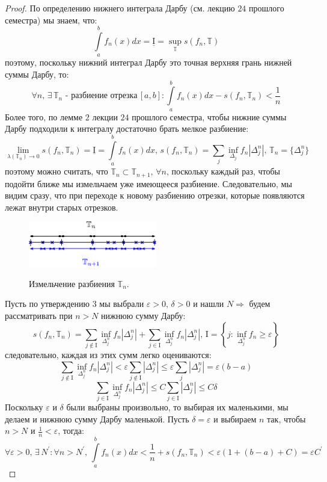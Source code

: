 \documentclass[12pt]{article}
\newcommand{\MTB}{\mathbb{T}}
\newcommand{\MI}{\mathrm{I}}
\newcommand{\VE}{\varepsilon}
\theoremstyle{definition}
\newcommand{\ddint}[2]{\displaystyle\int\limits_{#1}^{#2}}
\begin{document}
\begin{proof}
	По определению нижнего интеграла Дарбу (см. лекцию $24$ прошлого семестра) мы знаем, что: 
	$$
		\ddint{a}{b}f_n(x)dx = \underline{\MI} = \sup\limits_{\MTB}s(f_n,\MTB)
	$$
	поэтому, поскольку нижний интеграл Дарбу это точная верхняя грань нижней суммы Дарбу, то:
	$$
		\forall n, \, \exists \, \MTB_n \text{ - разбиение отрезка} \, [a,b] \colon \ddint{a}{b} f_n(x)dx - s(f_n, \MTB_n) < \dfrac{1}{n}
	$$
	Более того, по лемме $2$ лекции $24$ прошлого семестра, чтобы нижние суммы Дарбу подходили к интегралу достаточно брать мелкое разбиение:
	$$
		\lim\limits_{\lambda(\MTB_n) \to 0} s(f_n,\MTB_n)  = \underline{\MI} = \ddint{a}{b}f_n(x)dx, \, s(f_n, \MTB_n) = \sum\limits_{j}\inf\limits_{\Delta_j}f_n |\Delta_j^n|, \, \MTB_n = \{\Delta_j^n\}
	$$
	поэтому можно считать, что $\MTB_n \subset \MTB_{n + 1}, \, \forall n$, поскольку каждый раз, чтобы подойти ближе мы измельчаем уже имеющееся разбиение. Следовательно, мы видим сразу, что при переходе к новому разбиению отрезки, которые появляются лежат внутри старых отрезков.
	\begin{figure}[H]
		\centering
		\includegraphics[width=0.5\textwidth]{MA3L13_3.eps}
		\label{MA3L13_3}
		\caption{Измельчение разбиения $\MTB_n$.}
		\label{fig:измельчение	}
	\end{figure}
	Пусть по утверждению $3$ мы выбрали $\VE > 0, \, \delta > 0$ и нашли $N \Rightarrow$ будем рассматривать при $n > N$ нижнюю сумму Дарбу:
	$$
		s(f_n, \MTB_n) = \sum\limits_{j \notin \MI}\inf\limits_{\Delta_j^n}f_n|\Delta_j^n| + \sum\limits_{j \in \MI}\inf\limits_{\Delta_j^n}f_n|\Delta_j^n|, \, \MI = \left\{j \colon \inf\limits_{\Delta_j^n}f_n \geq \VE\right\}
	$$
	следовательно, каждая из этих сумм легко оцениваются:
	$$
		\sum\limits_{j \notin \MI}\inf\limits_{\Delta_j^n}f_n|\Delta_j^n| < \VE \sum\limits_{j \notin \MI}|\Delta_j^n| \leq \VE\sum\limits_{j} |\Delta_j^n| = \VE (b-a)
	$$
	$$
		\sum\limits_{j \in \MI}\inf\limits_{\Delta_j^n}f_n|\Delta_j^n| \leq C \sum\limits_{j \in \MI}|\Delta_j^n| \leq C \delta
	$$
	Поскольку $\VE$ и $\delta$ были выбраны произвольно, то выбирая их маленькими, мы делаем и нижнюю сумму Дарбу маленькой. Пусть $\delta = \VE$ и выбираем $n$ так, чтобы $n > N$ и $\tfrac{1}{n} < \VE$, тогда:
	$$
		\forall \VE > 0, \, \exists \, N^\prime \colon \forall n > N^\prime, \, \ddint{a}{b}f_n(x)dx < \dfrac{1}{n} + s(f_n, \MTB_n) <  \VE ( 1 + (b-a) + C) = \VE C^\prime 
	$$
\end{proof}
\end{document}
